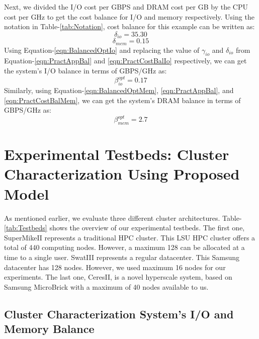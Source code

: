 \documentclass[journal]{IEEEtran}
\begin{document}
Next, we divided the I/O cost per GBPS  and DRAM cost per GB by the CPU cost per GHz to get the cost balance for I/O and memory respectively. Using the notation in Table-\ref{tab:Notation}, cost balance for this example can be written as: 
\begin{equation} \label{eqn:PractCostBalIo}
\delta_{io} = 35.30 
\end{equation}
\begin{equation} \label{eqn:PractCostBalMem}
\delta_{mem} = 0.15
\end{equation}
Using Equation-\ref{eqn:BalancedOptIo} and replacing the value of $\gamma_{io}$ and $\delta_{io}$ from Equation-\ref{eqn:PractAppBal} and \ref{eqn:PractCostBalIo} respectively, we can get the system's I/O balance in terms of GBPS/GHz as:
\begin{equation} \label{eqn:PractSysBalIo}
\beta_{io}^{opt} = 0.17
\end{equation}
Similarly, using Equation-\ref{eqn:BalancedOptMem}, \ref{eqn:PractAppBal}, and \ref{eqn:PractCostBalMem}, we can get the system's DRAM balance in terms of GBPS/GHz as:
\begin{equation} \label{eqn:PractSysBalMem}
\beta_{mem}^{opt} = 2.7
\end{equation} 

\section{Experimental Testbeds: Cluster Characterization Using Proposed Model} \label{sec:ExperimentalTestbed}
As mentioned earlier, we evaluate three different cluster architectures. Table-\ref{tab:Testbeds} shows the overview of our experimental testbeds. The first one, SuperMikeII represents a traditional HPC cluster. This LSU HPC cluster offers a total of 440 computing nodes. However, a maximum 128 can be allocated at a time to a single user. SwatIII represents a regular datacenter. This Samsung datacenter has 128 nodes. However, we used maximum 16 nodes for our experiments. The last one, CeresII, is a novel hyperscale system, based on Samsung MicroBrick with a maximum of 40 nodes available to us.

\subsection{Cluster Characterization System's I/O and Memory Balance}
\end{document}
